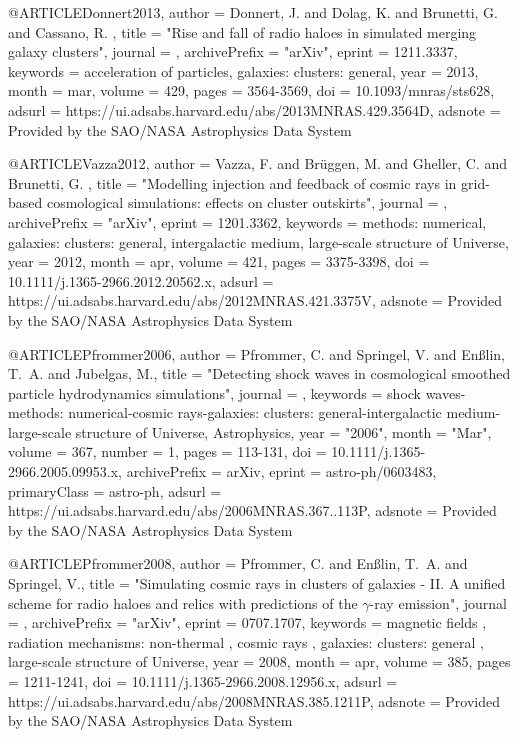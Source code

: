 \documentclass[useAMS,usenatbib]{mnras}
\begin{document}
{{{{{{@ARTICLE{Donnert2013,
   author = {{Donnert}, J. and {Dolag}, K. and {Brunetti}, G. and {Cassano}, R.
	},
    title = "{Rise and fall of radio haloes in simulated merging galaxy clusters}",
  journal = {\mnras},
archivePrefix = "arXiv",
   eprint = {1211.3337},
 keywords = {acceleration of particles, galaxies: clusters: general},
     year = 2013,
    month = mar,
   volume = 429,
    pages = {3564-3569},
      doi = {10.1093/mnras/sts628},
   adsurl = {https://ui.adsabs.harvard.edu/abs/2013MNRAS.429.3564D},
  adsnote = {Provided by the SAO/NASA Astrophysics Data System}
}

@ARTICLE{Vazza2012,
   author = {{Vazza}, F. and {Br{\"u}ggen}, M. and {Gheller}, C. and {Brunetti}, G.
	},
    title = "{Modelling injection and feedback of cosmic rays in grid-based cosmological simulations: effects on cluster outskirts}",
  journal = {\mnras},
archivePrefix = "arXiv",
   eprint = {1201.3362},
 keywords = {methods: numerical, galaxies: clusters: general, intergalactic medium, large-scale structure of Universe},
     year = 2012,
    month = apr,
   volume = 421,
    pages = {3375-3398},
      doi = {10.1111/j.1365-2966.2012.20562.x},
   adsurl = {https://ui.adsabs.harvard.edu/abs/2012MNRAS.421.3375V},
  adsnote = {Provided by the SAO/NASA Astrophysics Data System}
}

@ARTICLE{Pfrommer2006,
       author = {{Pfrommer}, C. and {Springel}, V. and {En{\ss}lin}, T.~A. and
         {Jubelgas}, M.},
        title = "{Detecting shock waves in cosmological smoothed particle hydrodynamics simulations}",
      journal = {\mnras},
     keywords = {shock waves-methods: numerical-cosmic rays-galaxies: clusters: general-intergalactic medium-large-scale structure of Universe, Astrophysics},
         year = "2006",
        month = "Mar",
       volume = {367},
       number = {1},
        pages = {113-131},
          doi = {10.1111/j.1365-2966.2005.09953.x},
archivePrefix = {arXiv},
       eprint = {astro-ph/0603483},
 primaryClass = {astro-ph},
       adsurl = {https://ui.adsabs.harvard.edu/abs/2006MNRAS.367..113P},
      adsnote = {Provided by the SAO/NASA Astrophysics Data System}
}

@ARTICLE{Pfrommer2008,
   author = {{Pfrommer}, C. and {En{\ss}lin}, T.~A. and {Springel}, V.},
    title = "{Simulating cosmic rays in clusters of galaxies - II. A unified scheme for radio haloes and relics with predictions of the {$\gamma$}-ray emission}",
  journal = {\mnras},
archivePrefix = "arXiv",
   eprint = {0707.1707},
 keywords = {magnetic fields , radiation mechanisms: non-thermal , cosmic rays , galaxies: clusters: general , large-scale structure of Universe},
     year = 2008,
    month = apr,
   volume = 385,
    pages = {1211-1241},
      doi = {10.1111/j.1365-2966.2008.12956.x},
   adsurl = {https://ui.adsabs.harvard.edu/abs/2008MNRAS.385.1211P},
  adsnote = {Provided by the SAO/NASA Astrophysics Data System}
}

}}}}}}
\end{document}

